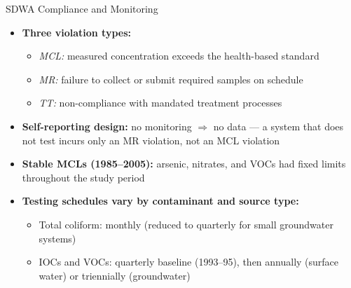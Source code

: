 \documentclass{beamer}
\begin{document}
\begin{frame}{SDWA Compliance and Monitoring}
\begin{itemize}
    \item \textbf{Three violation types:}
    \begin{itemize}
        \item \textit{MCL:} measured concentration exceeds the health-based standard
        \item \textit{MR:} failure to collect or submit required samples on schedule
        \item \textit{TT:} non-compliance with mandated treatment processes
    \end{itemize}
    \item \textbf{Self-reporting design:} no monitoring $\Rightarrow$ no data —
          a system that does not test incurs only an MR violation, not an MCL violation
    \item \textbf{Stable MCLs (1985–2005):} arsenic, nitrates, and VOCs
          had fixed limits throughout the study period
    \item \textbf{Testing schedules vary by contaminant and source type:}
    \begin{itemize}
        \item Total coliform: monthly (reduced to quarterly for small groundwater systems)
        \item IOCs and VOCs: quarterly baseline (1993–95), then annually
              (surface water) or triennially (groundwater)
    \end{itemize}
\end{itemize}
\end{frame}
\end{document}

